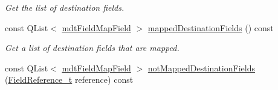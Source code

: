 \begin{DoxyCompactItemize}
\begin{DoxyCompactList}\small\item\em Get the list of destination fields. \end{DoxyCompactList}\item 
const QList$<$ \hyperlink{classmdt_field_map_field}{mdtFieldMapField} $>$ \hyperlink{classmdt_field_map_a08704f082e3fe407a2e395c98a5eec60}{mappedDestinationFields} () const 
\begin{DoxyCompactList}\small\item\em Get a list of destination fields that are mapped. \end{DoxyCompactList}\item 
\hypertarget{classmdt_field_map_a3b618d50c5c7cb8c1086dba5db18d7a7}{
const QList$<$ \hyperlink{classmdt_field_map_field}{mdtFieldMapField} $>$ \hyperlink{classmdt_field_map_a3b618d50c5c7cb8c1086dba5db18d7a7}{notMappedDestinationFields} (\hyperlink{classmdt_field_map_a8a8dd62273d396d926bf3df837407392}{FieldReference\_\-t} reference) const }
\label{classmdt_field_map_a3b618d50c5c7cb8c1086dba5db18d7a7}


\end{DoxyCompactItemize}
